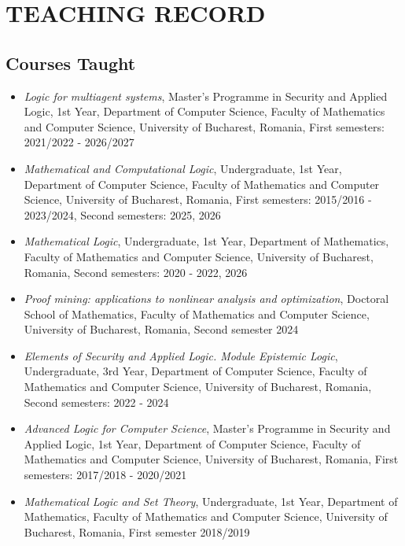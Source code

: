 \documentclass[12pt]{article}
\begin{document}
\section*{TEACHING RECORD}


\subsection*{Courses Taught}

\begin{itemize}

\item {\it Logic for multiagent systems}, Master's Programme in Security and Applied Logic, 1st Year, Department of Computer Science, Faculty of Mathematics and Computer Science, University of Bucharest, Romania, First semesters: 2021/2022 - 2026/2027

\item {\it Mathematical  and Computational Logic}, Undergraduate, 1st Year, Department of Computer Science, Faculty of Mathematics and Computer Science, University of Bucharest, Romania, First semesters: 2015/2016 - 2023/2024, Second semesters: 2025, 2026

\item {\it Mathematical Logic}, Undergraduate, 1st Year, Department of Mathematics, Faculty of Mathematics and Computer Science, University of Bucharest, Romania, Second semesters: 2020 - 2022, 2026

\item {\it Proof mining: applications to nonlinear analysis and optimization}, Doctoral School of Mathematics, 
Faculty of Mathematics and Computer Science, University of Bucharest, Romania, Second semester 2024

\item {\it Elements of  Security and Applied Logic. Module Epistemic Logic}, Undergraduate, 3rd Year, Department of Computer Science, 
Faculty of Mathematics and Computer Science, University of Bucharest, Romania, Second semesters: 2022 - 2024

\item {\it Advanced Logic for Computer Science}, Master's Programme in Security and Applied Logic, 1st Year, Department of Computer Science, Faculty of Mathematics and Computer Science, University of Bucharest, Romania, First semesters: 2017/2018 - 2020/2021

\item {\it Mathematical Logic and Set Theory}, Undergraduate, 1st Year, Department of Mathematics, Faculty of Mathematics and Computer Science, University of Bucharest, Romania, First semester 2018/2019


\end{itemize}
\end{document}
